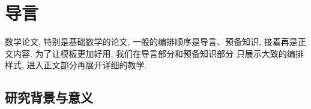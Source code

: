 \documentclass[12pt,a4paper,UTF8]{ctexart}
\renewcommand{\thepage}{\roman{page}} %
\begin{document}
\pagestyle{plain}  %
\renewcommand{\thepage}{\arabic{page}}
\setcounter{page}{1}

\singlespacing
\setlength{\baselineskip}{20pt} %

\section{导言}

数学论文, 特别是基础数学的论文, 一般的编排顺序是导言、预备知识, 
接着再是正文内容. 为了让模板更加好用, 我们在导言部分和预备知识部分
只展示大致的编排样式, 进入正文部分再展开详细的教学. 

\subsection{研究背景与意义}
\end{document}

